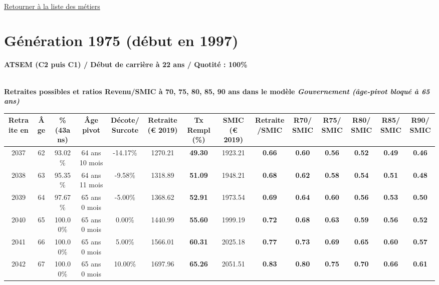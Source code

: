 ~\\ 
 
 \hyperlink{page.2}{\noindent Retourner à la liste des métiers}

 \newpage 

\section{Génération 1975 (début en 1997)\label{ATSEM_100_22_1975_0}} 
 
{\bf \noindent ATSEM (C2 puis C1) / Début de carrière à 22 ans / Quotité : 100\%}  ~ 

 ~\\{\bf \noindent Retraites possibles et ratios Revenu/SMIC à 70, 75, 80, 85, 90 ans dans le modèle \emph{Gouvernement (âge-pivot bloqué à 65 ans)}}  
 
\begin{adjustbox}{max width=\textwidth} 
\begin{tabular}[htb]{|c|c||c|c|c||c|c||c|c||c|c|c|c|c|} 
\hline 
 Retraite en &  Âge &  \%(43ans) &  Âge pivot &  Décote/Surcote &  Retraite (\euro{} 2019) &  Tx Rempl(\%) &  SMIC (\euro{} 2019) &  Retraite/SMIC &  R70/SMIC &  R75/SMIC &  R80/SMIC &  R85/SMIC &  R90/SMIC \\ 
\hline \hline 
 2037 &  62 &  93.02\% &  64 ans 10 mois &  -14.17\% &  1270.21 &  {\bf 49.30} &  1923.21 &  {\bf {\color{red} 0.66}} &  {\bf {\color{red} 0.60}} &  {\bf {\color{red} 0.56}} &  {\bf {\color{red} 0.52}} &  {\bf {\color{red} 0.49}} &  {\bf {\color{red} 0.46}} \\ 
\hline 
 2038 &  63 &  95.35\% &  64 ans 11 mois &  -9.58\% &  1318.89 &  {\bf 51.09} &  1948.21 &  {\bf {\color{red} 0.68}} &  {\bf {\color{red} 0.62}} &  {\bf {\color{red} 0.58}} &  {\bf {\color{red} 0.54}} &  {\bf {\color{red} 0.51}} &  {\bf {\color{red} 0.48}} \\ 
\hline 
 2039 &  64 &  97.67\% &  65 ans 0 mois &  -5.00\% &  1368.62 &  {\bf 52.91} &  1973.54 &  {\bf {\color{red} 0.69}} &  {\bf {\color{red} 0.64}} &  {\bf {\color{red} 0.60}} &  {\bf {\color{red} 0.56}} &  {\bf {\color{red} 0.53}} &  {\bf {\color{red} 0.50}} \\ 
\hline 
 2040 &  65 &  100.00\% &  65 ans 0 mois &  0.00\% &  1440.99 &  {\bf 55.60} &  1999.19 &  {\bf {\color{red} 0.72}} &  {\bf {\color{red} 0.68}} &  {\bf {\color{red} 0.63}} &  {\bf {\color{red} 0.59}} &  {\bf {\color{red} 0.56}} &  {\bf {\color{red} 0.52}} \\ 
\hline 
 2041 &  66 &  100.00\% &  65 ans 0 mois &  5.00\% &  1566.01 &  {\bf 60.31} &  2025.18 &  {\bf {\color{red} 0.77}} &  {\bf {\color{red} 0.73}} &  {\bf {\color{red} 0.69}} &  {\bf {\color{red} 0.65}} &  {\bf {\color{red} 0.60}} &  {\bf {\color{red} 0.57}} \\ 
\hline 
 2042 &  67 &  100.00\% &  65 ans 0 mois &  10.00\% &  1697.96 &  {\bf 65.26} &  2051.51 &  {\bf {\color{red} 0.83}} &  {\bf {\color{red} 0.80}} &  {\bf {\color{red} 0.75}} &  {\bf {\color{red} 0.70}} &  {\bf {\color{red} 0.66}} &  {\bf {\color{red} 0.61}} \\ 
\hline 
\hline 
\end{tabular} 
\end{adjustbox} 
 
